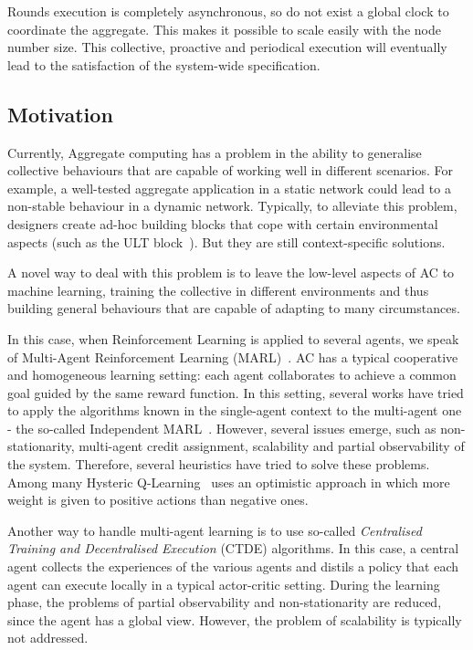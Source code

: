 \documentclass[conference]{IEEEtran}
\begin{document}
Rounds execution is completely asynchronous, so do not exist a global clock to coordinate the aggregate. 
 This makes it possible to scale easily with the node number size. This collective, proactive and periodical execution will eventually lead to the satisfaction of the system-wide specification.

\subsection{Motivation}
Currently, Aggregate computing has a problem in the ability to generalise collective behaviours that are capable of working well in different scenarios. 
 For example, a well-tested aggregate application in a static network could lead to a non-stable behaviour in a dynamic network. 
 Typically, to alleviate this problem, designers create ad-hoc building blocks that cope with certain environmental aspects (such as the ULT block~\cite{DBLP:conf/saso/AudritoCDV17}). 
 But they are still context-specific solutions.

A novel way to deal with this problem is to leave the low-level aspects of AC to machine learning, 
 training the collective in different environments and thus building general behaviours that are capable of adapting to many circumstances.

In this case, when Reinforcement Learning is applied to several agents, we speak of Multi-Agent Reinforcement Learning (MARL)~\cite{DBLP:journals/aamas/Hernandez-LealK19}.
 AC has a typical cooperative and homogeneous learning setting: 
 each agent collaborates to achieve a common goal guided by the same reward function.
In this setting, several works have tried to apply the algorithms known in the single-agent context to the multi-agent one - the so-called Independent MARL~\cite{DBLP:journals/tsmc/BusoniuBS08}. 
 However, several issues emerge, such as non-stationarity, multi-agent credit assignment, scalability and partial observability of the system. 
 Therefore, several heuristics have tried to solve these problems.
Among many Hysteric Q-Learning~\cite{hysteretic-q} uses an optimistic approach in which more weight is given to positive actions than negative ones.

Another way to handle multi-agent learning is to use so-called \textit{Centralised Training and Decentralised Execution} (CTDE) algorithms. 
 In this case, a central agent collects the experiences of the various agents and distils a policy that each agent can execute locally in a typical actor-critic setting. 
 During the learning phase, the problems of partial observability and non-stationarity are reduced, since the agent has a global view. 
 However, the problem of scalability is typically not addressed.
\end{document}
